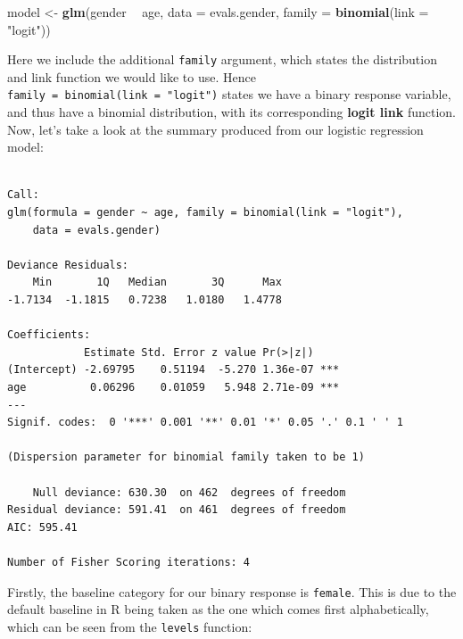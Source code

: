 \documentclass[]{article}
\newenvironment{Shaded}{\begin{snugshade}}{\end{snugshade}}
\newcommand{\KeywordTok}[1]{\textcolor[rgb]{0.13,0.29,0.53}{\textbf{#1}}}
\newcommand{\DataTypeTok}[1]{\textcolor[rgb]{0.13,0.29,0.53}{#1}}
\newcommand{\StringTok}[1]{\textcolor[rgb]{0.31,0.60,0.02}{#1}}
\newcommand{\OperatorTok}[1]{\textcolor[rgb]{0.81,0.36,0.00}{\textbf{#1}}}
\newcommand{\NormalTok}[1]{#1}
\begin{document}
\begin{Shaded}
\begin{Highlighting}[]
\NormalTok{model <-}\StringTok{ }\KeywordTok{glm}\NormalTok{(gender }\OperatorTok{~}\StringTok{ }\NormalTok{age, }\DataTypeTok{data =}\NormalTok{ evals.gender, }\DataTypeTok{family =} \KeywordTok{binomial}\NormalTok{(}\DataTypeTok{link =} \StringTok{"logit"}\NormalTok{))}
\end{Highlighting}
\end{Shaded}

Here we include the additional \texttt{family} argument, which states
the distribution and link function we would like to use. Hence
\texttt{family\ =\ binomial(link\ =\ "logit")} states we have a binary
response variable, and thus have a binomial distribution, with its
corresponding \textbf{logit link} function. Now, let's take a look at
the summary produced from our logistic regression model:

\begin{Shaded}
\end{Shaded}

\begin{verbatim}

Call:
glm(formula = gender ~ age, family = binomial(link = "logit"), 
    data = evals.gender)

Deviance Residuals: 
    Min       1Q   Median       3Q      Max  
-1.7134  -1.1815   0.7238   1.0180   1.4778  

Coefficients:
            Estimate Std. Error z value Pr(>|z|)    
(Intercept) -2.69795    0.51194  -5.270 1.36e-07 ***
age          0.06296    0.01059   5.948 2.71e-09 ***
---
Signif. codes:  0 '***' 0.001 '**' 0.01 '*' 0.05 '.' 0.1 ' ' 1

(Dispersion parameter for binomial family taken to be 1)

    Null deviance: 630.30  on 462  degrees of freedom
Residual deviance: 591.41  on 461  degrees of freedom
AIC: 595.41

Number of Fisher Scoring iterations: 4
\end{verbatim}

Firstly, the baseline category for our binary response is
\texttt{female}. This is due to the default baseline in R being taken as
the one which comes first alphabetically, which can be seen from the
\texttt{levels} function:
\end{document}
